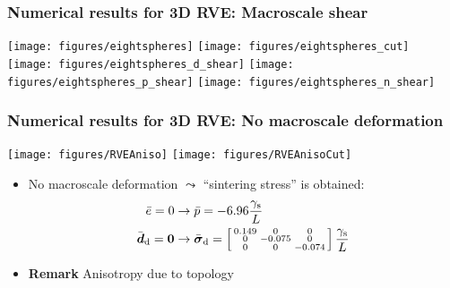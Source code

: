 \documentclass[11pt]{beamer} %
\renewcommand{\dev}{\mathrm{d}}
\newcommand{\surf}{\mathrm{s}}
\begin{document}
\begin{frame}
 \frametitle{Numerical results for 3D RVE: Macroscale shear}
\begin{center}
 \texttt{[image: figures/eightspheres]}
 \texttt{[image: figures/eightspheres\_cut]}
\\
 \texttt{[image: figures/eightspheres\_d\_shear]}
 \texttt{[image: figures/eightspheres\_p\_shear]}
 \texttt{[image: figures/eightspheres\_n\_shear]}
\end{center}
\end{frame}

\begin{frame}
 \frametitle{Numerical results for 3D RVE: No macroscale deformation}
\begin{center}
 \texttt{[image: figures/RVEAniso]}
\hspace{1cm}
 \texttt{[image: figures/RVEAnisoCut]}
\end{center}
 \begin{itemize}
  \item No macroscale deformation $\leadsto$ ``sintering stress'' is obtained:
  \begin{align*}
   \bar{e} = 0 &\rightarrow \bar{p} = -6.96 \frac{\gamma_\surf}{L}
\\
   \bar{\ts d}_\dev = \ts 0 &\rightarrow \bar{\ts\sigma}_\dev = \left[\begin{smallmatrix} 0.149 & 0 & 0 \\ 0 & -0.075 & 0 \\ 0 & 0 & -0.074 \end{smallmatrix}\right]\frac{\gamma_\surf}{L}
  \end{align*}
 \item \textbf{Remark} Anisotropy due to topology
 \end{itemize}
\end{frame}
\end{document}
